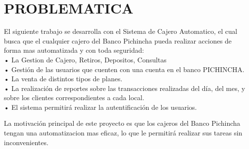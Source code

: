 \section{PROBLEMATICA} 
\par El siguiente trabajo se desarrolla con el Sistema de Cajero Automatico, el cual  busca que el cualquier cajero del Banco Pichincha pueda realizar acciones de forma mas automatizada y con toda seguridad: \\
•	La Gestion de Cajero, Retiros, Depositos, Consultas\\
•	Gestión de las usuarios que cuenten con una cuenta en el banco PICHINCHA.\\
•	La venta de distintos tipos de planes.\\
•	La realización de reportes sobre las transacciones  realizadas del día, del mes, y sobre los clientes correspondientes a cada local.\\
•	El sistema permitirá realizar la autentificación de los usuarios.\\

\par La motivación principal de este proyecto es que los cajeros del Banco Pichincha tengan una automatizacion mas eficaz, lo que le permitirá realizar sus tareas sin inconvenientes.